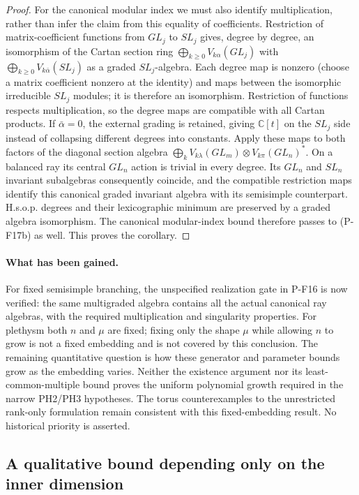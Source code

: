 \documentclass[11pt,a4paper]{article}
\begin{document}
\begin{proof}
For the canonical modular index we must also identify multiplication,
rather than infer the claim from this equality of coefficients.
Restriction of matrix-coefficient functions from $GL_j$ to $SL_j$
gives, degree by degree, an isomorphism of the Cartan section ring
$\bigoplus_{k\ge0}V_{k\alpha}(GL_j)$ with
$\bigoplus_{k\ge0}V_{k\bar\alpha}(SL_j)$ as a graded
$SL_j$-algebra. Each degree map is nonzero (choose a matrix coefficient
nonzero at the identity) and maps between the isomorphic irreducible
$SL_j$ modules; it is therefore an isomorphism. Restriction of
functions respects multiplication, so the degree maps are compatible
with all Cartan products. If $\bar\alpha=0$, the external grading
is retained, giving $\mathbb C[t]$ on the $SL_j$ side instead of
collapsing different degrees into constants.
Apply these maps to both factors of the diagonal section algebra
$\bigoplus_k V_{k\lambda}(GL_m)\otimes V_{k\pi}(GL_n)^*$.
On a balanced ray its central $GL_n$ action is trivial in every
degree. Its $GL_n$ and $SL_n$ invariant subalgebras consequently
coincide, and the compatible restriction maps identify this canonical
graded invariant algebra with its semisimple counterpart. H.s.o.p.
degrees and their lexicographic minimum are preserved by a graded
algebra isomorphism. The canonical modular-index bound therefore
passes to (P-F17b) as well. This proves the corollary.
\end{proof}

\paragraph{What has been gained.}
For fixed semisimple branching, the unspecified realization gate in
P-F16 is now verified: the same multigraded algebra contains all the
actual canonical ray algebras, with the required multiplication and
singularity properties. For plethysm both $n$ and $\mu$ are fixed;
fixing only the shape $\mu$ while allowing $n$ to grow is not a
fixed embedding and is not covered by this conclusion.
The remaining quantitative question is how these generator and
parameter bounds grow as the embedding varies. Neither the existence
argument nor its least-common-multiple bound proves the uniform
polynomial growth required in the narrow PH2/PH3 hypotheses. The
torus counterexamples to the unrestricted rank-only formulation
remain consistent with this fixed-embedding result. No historical
priority is asserted.


\subsection{A qualitative bound depending only on the inner dimension}
\end{document}
